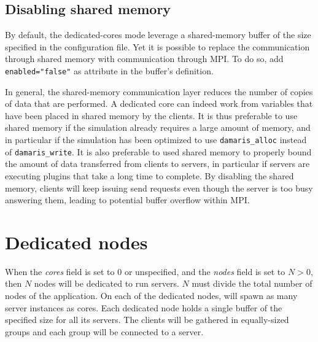 \subsection*{Disabling shared memory}

By default, the dedicated-cores mode leverage a shared-memory buffer of the size specified in
the configuration file. Yet it is possible to replace the communication through shared memory with
communication through MPI. To do so, add \verb+enabled="false"+ as attribute in the buffer's definition.

In general, the shared-memory communication layer reduces the number of copies of data that are
performed. A dedicated core can indeed work from variables that have been placed in shared memory by the
clients. It is thus preferable to use shared memory if the simulation already requires a large amount of memory,
and in particular if the simulation has been optimized to use \texttt{damaris\_alloc} instead of \texttt{damaris\_write}.
It is also preferable to used shared memory to properly bound the amount of data transferred from clients to servers,
in particular if servers are executing plugins that take a long time to complete. By disabling the shared memory,
clients will keep issuing send requests even though the server is too busy answering them, leading to potential
buffer overflow within MPI.

\section{Dedicated nodes}

When the \emph{cores} field is set to 0 or unspecified, and the \emph{nodes} field is set to $N > 0$,
then $N$ nodes will be dedicated to run servers. $N$ must divide the total number of nodes of the
application. On each of the dedicated nodes, \Damaris{} will spawn as many
server instances as cores. Each dedicated node holds a single buffer of the specified size for all
its servers. The clients will be gathered in equally-sized groups and each group will be connected to
a server.
